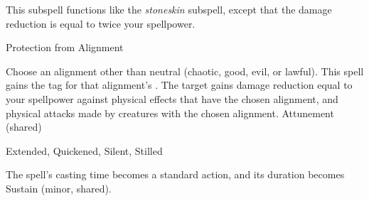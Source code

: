 This subspell functions like the \textit{stoneskin} subspell, except that the damage reduction is equal to twice your spellpower.
\begin{spellsection}{Protection from Alignment}
\begin{spellcontent}
\begin{spelltargetinginfo}
\end{spelltargetinginfo}
\begin{spelleffects}
\spellspecial
Choose an alignment other than neutral (chaotic, good, evil, or lawful).
This spell gains the tag for that alignment's .
\spelleffect
The target gains damage reduction equal to your spellpower against physical effects that have the chosen alignment, and physical attacks made by creatures with the chosen alignment.
\spelldur Attunement (shared)
\end{spelleffects}
\end{spellcontent}
\begin{spellfooter}
 Extended, Quickened, Silent, Stilled
\end{spellfooter}
\begin{spellsubcontent}
\begin{spellcantrip}
The spell's casting time becomes a standard action, and its duration becomes Sustain (minor, shared).
\end{spellcantrip}
\end{spellsubcontent}
\end{spellsection}
